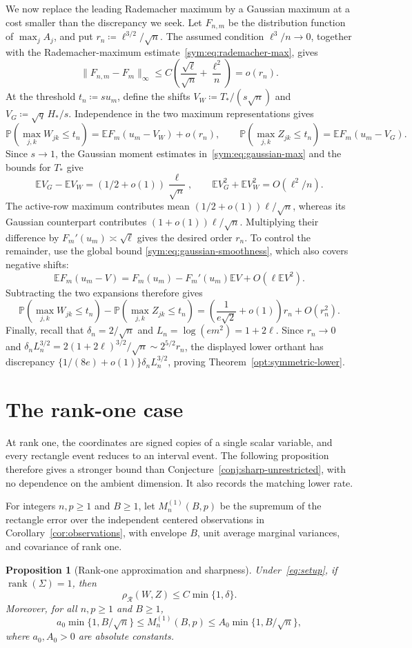\documentclass[11pt,letterpaper]{article}
\newtheorem{proposition}{Proposition}
\theoremstyle{remark}
\newcommand{\E}{\mathbb E}
\newcommand{\Pp}{\mathbb P}
\newcommand{\rh}{\rho_{\mathcal R}}
\begin{document}
We now replace the leading Rademacher maximum by a Gaussian maximum
at a cost smaller than the discrepancy we seek. Let \(F_{n,m}\) be
the distribution function of \(\max_jA_j\), and put
\(r_n\coloneqq\ell^{3/2}/\sqrt n\). The assumed condition
\(\ell^3/n\to0\), together with the Rademacher-maximum
estimate~\eqref{sym:eq:rademacher-max}, gives
\[
 \|F_{n,m}-F_m\|_\infty
 \le C\left(\frac{\sqrt\ell}{\sqrt n}+\frac{\ell^2}{n}\right)
 =o(r_n).
\]
At the threshold \(t_n\coloneqq s u_m\), define the shifts
\(V_W\coloneqq T_*/(s\sqrt n)\) and \(V_G\coloneqq\sqrt q\,H_*/s\).
Independence in the two maximum representations gives
\[
 \Pp(\max_{j,k}W_{jk}\le t_n)=\E F_m(u_m-V_W)+o(r_n),
 \qquad
 \Pp(\max_{j,k}Z_{jk}\le t_n)=\E F_m(u_m-V_G).
\]
Since \(s\to1\), the Gaussian moment estimates
in~\eqref{sym:eq:gaussian-max} and the bounds for \(T_*\) give
\[
 \E V_G-\E V_W=(1/2+o(1))\frac\ell{\sqrt n},
 \qquad \E V_G^2+\E V_W^2=O(\ell^2/n).
\]
The active-row maximum contributes mean \((1/2+o(1))\ell/\sqrt n\),
whereas its Gaussian counterpart contributes \((1+o(1))\ell/\sqrt n\).
Multiplying their difference by \(F_m'(u_m)\asymp\sqrt\ell\) gives
the desired order \(r_n\).
To control the remainder, use the global bound
\eqref{sym:eq:gaussian-smoothness}, which also covers negative shifts:
\[
 \E F_m(u_m-V)=F_m(u_m)-F_m'(u_m)\E V+O(\ell\E V^2).
\]
Subtracting the two expansions therefore gives
\[
 \Pp(\max_{j,k}W_{jk}\le t_n)-\Pp(\max_{j,k}Z_{jk}\le t_n)
 =\left(\frac1{e\sqrt2}+o(1)\right)r_n+O(r_n^2).
\]
Finally, recall that \(\delta_n=2/\sqrt n\) and
\(L_n=\log(em^2)=1+2\ell\). Since \(r_n\to0\) and
\(\delta_nL_n^{3/2}=2(1+2\ell)^{3/2}/\sqrt n\sim2^{5/2}r_n\),
the displayed lower orthant has discrepancy
\(\{1/(8e)+o(1)\}\delta_nL_n^{3/2}\), proving Theorem~\ref{opt:symmetric-lower}.


\clearpage
\section{The rank-one case}\label{app:rank-one}
At rank one, the coordinates are signed copies of a single scalar
variable, and every rectangle event reduces to an interval event.
The following proposition therefore gives a stronger bound than
Conjecture~\ref{conj:sharp-unrestricted}, with no dependence on the
ambient dimension. It also records the matching lower rate.

For integers \(n,p\ge1\) and \(B\ge1\), let \(M_n^{(1)}(B,p)\) be the
supremum of the rectangle error over the independent centered
observations in Corollary~\ref{cor:observations}, with envelope \(B\),
unit average marginal variances, and covariance of rank one.
\begin{proposition}[Rank-one approximation and sharpness]
\label{prop:rank-one}
Under~\eqref{eq:setup}, if \(\operatorname{rank}(\Sigma)=1\), then
\[
 \rh(W,Z)\le C\min\{1,\delta\}.
\]
Moreover, for all \(n,p\ge1\) and \(B\ge1\),
\[
 a_0\min\{1,B/\sqrt n\}\le M_n^{(1)}(B,p)
 \le A_0\min\{1,B/\sqrt n\},
\]
where \(a_0,A_0>0\) are absolute constants.
\end{proposition}
\end{document}
